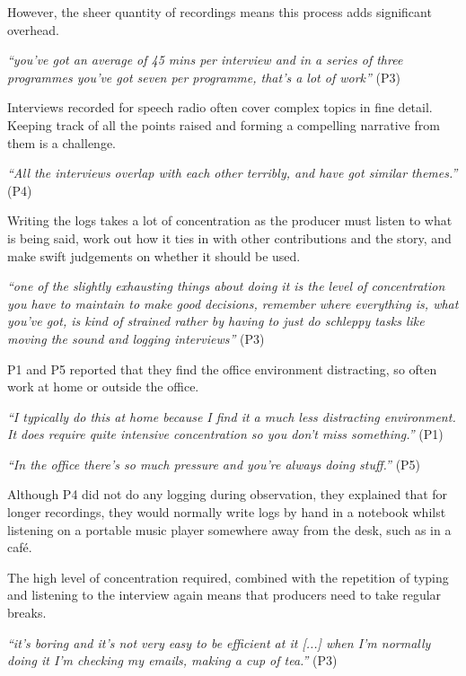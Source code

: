However, the sheer quantity of recordings means this process adds significant overhead.

\textit{``you've got an average of 45 mins per interview and in a series of
  three programmes you've got seven per programme, that's a lot of work''} (P3)

Interviews recorded for speech radio often cover complex topics in fine
detail. Keeping track of all the points raised and forming a compelling
narrative from them is a challenge.

\textit{``All the interviews overlap with each other terribly, and have got
  similar themes.''} (P4)

Writing the logs takes a lot of concentration as the producer must listen to
what is being said, work out how it ties in with other contributions and the
story, and make swift judgements on whether it should be used.

\textit{``one of the slightly exhausting things about doing it is the level of
  concentration you have to maintain to make good decisions, remember where
  everything is, what you've got, is kind of strained rather by having to just
  do schleppy tasks like moving the sound and logging interviews''} (P3)

P1 and P5 reported that they find the office environment distracting, so often work at home or outside the office.

\textit{``I typically do this at home because I find it a much less distracting
  environment. It does require quite intensive concentration so you don't miss
  something.''} (P1)

\textit{``In the office there's so much pressure and you're always doing stuff.''} (P5)

Although P4 did not do any logging during observation, they explained that for longer recordings, they
would normally write logs by hand in a notebook whilst listening on a
portable music player somewhere away from the desk, such as in a caf\'e.

The high level of concentration required, combined with the repetition of 
typing and listening to the interview again means that producers need to take
regular breaks.

\textit{``it's boring and it's not very easy to be efficient at it [...] when
  I'm normally doing it I'm checking my emails, making a cup of tea.''} (P3)

